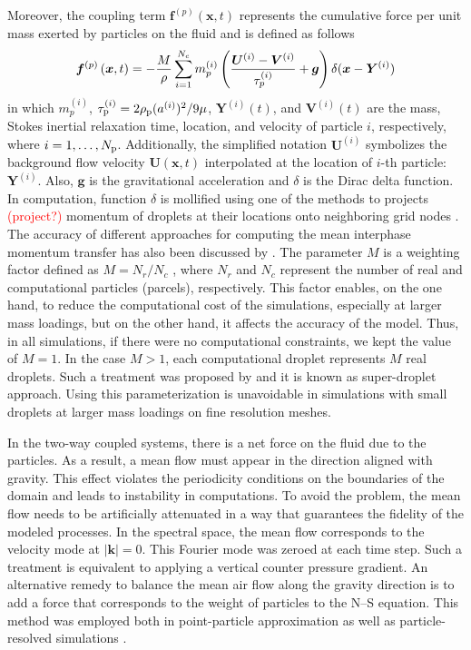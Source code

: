 \documentclass[../thesis.tex]{subfiles}
\begin{document}
Moreover, the coupling term $\boldsymbol f^{(p)}(\boldsymbol x,t)$ represents the cumulative force per unit mass exerted by particles on the fluid and is defined as follows
\begin{equation}
\boldsymbol{f}^{(p)}\left(\boldsymbol{x},t\right)
=
-{M \over \rho}\sum\limits_{i=1}^{N_c} m_p^{(i)} \left({{\boldsymbol{U}^{(i)}-\boldsymbol{V}^{(i)}} \over \tau_p^{(i)}}+\boldsymbol{g} \right)\delta(\boldsymbol{x} - \boldsymbol{Y}^{(i)})
\label{eq:fpart}
\end{equation}
in which $m_p^{(i)}$, $\tau_{\text p}^{(i)}=2\rho_{\text p}(a^{(i)})^2/9\mu$, $\boldsymbol{Y}^{(i)}(t)$, and $\boldsymbol{V}^{(i)}(t)$ are the mass, Stokes inertial relaxation time, location, and velocity of particle $i$, respectively, where $i=1,\dots, N_{\text p}$. Additionally, the simplified notation $\boldsymbol{U}^{(i)}$ symbolizes the background flow velocity $\boldsymbol{U}(\boldsymbol{x},t)$ interpolated at the location of $i$-th particle: $\boldsymbol{Y}^{(i)}$. Also, $\boldsymbol{g}$ is the gravitational acceleration and $\delta$ is the Dirac delta function. In computation, function $\delta$ is mollified using one of the methods to projects \textcolor{red}{(project?)} momentum of droplets at their locations onto neighboring grid nodes \citep{GAR07}. The accuracy of different approaches for computing the mean interphase momentum transfer has also been discussed by \cite{RPW20}.
The parameter $M$ is a weighting factor defined as $M=N_r/N_c$  \citep{ELG94}, where $N_r$ and $N_c$ represent the number of real and computational particles (parcels), respectively. This factor enables, on the one hand, to reduce the computational cost of the simulations, especially at larger mass loadings, but on the other hand, it affects the accuracy of the model. Thus, in all simulations, if there were no computational constraints, we kept the value of $M=1$. In the case $M > 1$, each computational droplet represents $M$ real droplets. Such a treatment was proposed by \cite{ELG94} and it is known as super-droplet approach. Using this parameterization is unavoidable in simulations with small droplets at larger mass loadings on fine resolution meshes. 

In the two-way coupled systems, there is a net force on the fluid due to the particles. As a result, a mean flow must appear in the direction aligned with gravity. This effect violates the periodicity conditions on the boundaries of the domain and leads to instability in computations. To avoid the problem, the mean flow needs to be artificially attenuated in a way that guarantees the fidelity of the modeled processes. In the spectral space, the mean flow corresponds to the velocity mode at $|\boldsymbol{k}| = 0$. This Fourier mode was zeroed at each time step. Such a treatment is equivalent to applying a vertical counter pressure gradient. An alternative remedy to balance the mean air flow along the gravity direction is to add a force that corresponds to the weight of particles to the N--S equation. This method was employed both in point-particle approximation \citep{MON17} as well as particle-resolved simulations \citep{ZVLT21}.
\end{document}
